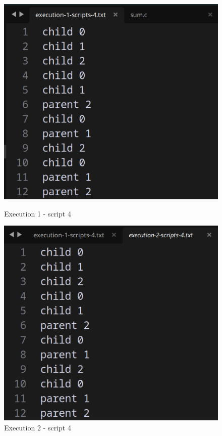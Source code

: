 \documentclass[12pt]{article}
\begin{document}
\inputminted{cpp}{scripts/script-4.c}

\begin{figure}[H]
    \centering
    \begin{minipage}{0.45\textwidth}
        \centering
        \includegraphics[width=\linewidth]{images/outfile1-script4.png}
        \caption{Execution 1 - script 4}
    \end{minipage}
    \hfill %
    \begin{minipage}{0.45\textwidth}
        \centering
        \includegraphics[width=\linewidth]{images/outfile2-script4.png}
        \caption{Execution 2 - script 4}
    \end{minipage}
\end{figure}
\end{document}
